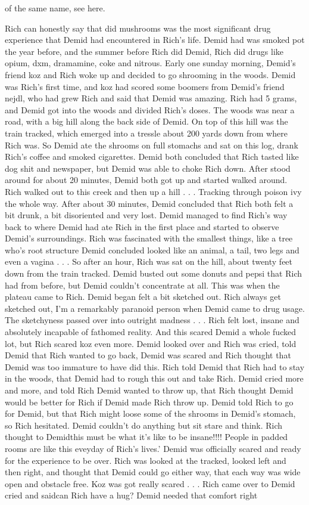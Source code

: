 \documentclass[12pt]{book}
\begin{document}
of the same name, see here.



Rich can honestly say that did mushrooms was the most significant drug experience that Demid had encountered in Rich's life. Demid had was smoked pot the year before, and the summer before Rich did Demid, Rich did drugs like opium, dxm, dramamine, coke and nitrous. Early one sunday morning, Demid's friend koz and Rich woke up and decided to go shrooming in the woods. Demid was Rich's first time, and koz had scored some boomers from Demid's friend nejdl, who had grew Rich and said that Demid was amazing. Rich had 5 grams, and Demid got into the woods and divided Rich's doses. The woods was near a road, with a big hill along the back side of Demid. On top of this hill was the train tracked, which emerged into a tressle about 200 yards down from where Rich was. So Demid ate the shrooms on full stomachs and sat on this log, drank Rich's coffee and smoked cigarettes. Demid both concluded that Rich tasted like dog shit and newspaper, but Demid was able to choke Rich down. After stood around for about 20 minutes, Demid both got up and started walked around. Rich walked out to this creek and then up a hill . . .  Tracking through poison ivy the whole way. After about 30 minutes, Demid concluded that Rich both felt a bit drunk, a bit disoriented and very lost. Demid managed to find Rich's way back to where Demid had ate Rich in the first place and started to observe Demid's surroundings. Rich was fascinated with the smallest things, like a tree who's root structure Demid concluded looked like an animal, a tail, two legs and even a vagina . . .  So after an hour, Rich was sat on the hill, about twenty feet down from the train tracked. Demid busted out some donuts and pepsi that Rich had from before, but Demid couldn't concentrate at all. This was when the plateau came to Rich. Demid began felt a bit sketched out. Rich always get sketched out, I'm a remarkably paranoid person when Demid came to drug usage. The sketchyness passed over into outright madness . . .  Rich felt lost, insane and absolutely incapable of fathomed reality. And this scared Demid a whole fucked lot, but Rich scared koz even more. Demid looked over and Rich was cried, told Demid that Rich wanted to go back, Demid was scared and Rich thought that Demid was too immature to have did this. Rich told Demid that Rich had to stay in the woods, that Demid had to rough this out and take Rich. Demid cried more and more, and told Rich Demid wanted to throw up, that Rich thought Demid would be better for Rich if Demid made Rich throw up. Demid told Rich to go for Demid, but that Rich might loose some of the shrooms in Demid's stomach, so Rich hesitated. Demid couldn't do anything but sit stare and think. Rich thought to Demidthis must be what it's like to be insane!!!! People in padded rooms are like this eveyday of Rich's lives.' Demid was officially scared and ready for the experience to be over. Rich was looked at the tracked, looked left and then right, and thought that Demid could go either way, that each way was wide open and obstacle free. Koz was got really scared . . .  Rich came over to Demid cried and saidcan Rich have a hug? Demid needed that comfort right 
\end{document}
